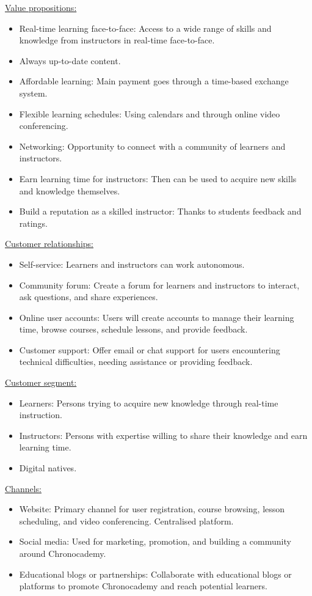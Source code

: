 \underline{Value propositions:}
\begin{itemize}
\item Real-time learning face-to-face: Access to a wide range of skills and knowledge from instructors in real-time face-to-face.
\item Always up-to-date content.
\item Affordable learning: Main payment goes through a time-based exchange system.
\item Flexible learning schedules: Using calendars and through online video conferencing.
\item Networking: Opportunity to connect with a community of learners and instructors.
\item Earn learning time for instructors: Then can be used to acquire new skills and knowledge themselves.
\item Build a reputation as a skilled instructor: Thanks to students feedback and ratings.
\end{itemize}

\underline{Customer relationships:}
\begin{itemize}
\item Self-service: Learners and instructors can work autonomous.
\item Community forum: Create a forum for learners and instructors to interact, ask questions, and share experiences.
\item Online user accounts: Users will create accounts to manage their learning time, browse courses, schedule lessons, and provide feedback.
\item Customer support: Offer email or chat support for users encountering technical difficulties, needing assistance or providing feedback.
\end{itemize}

\underline{Customer segment:}
\begin{itemize}
\item Learners: Persons trying to acquire new knowledge through real-time instruction.
\item Instructors: Persons with expertise willing to share their knowledge and earn learning time.
\item Digital natives.
\end{itemize}

\underline{Channels:}
\begin{itemize}
\item Website: Primary channel for user registration, course browsing, lesson scheduling, and video conferencing.
Centralised platform.
\item Social media: Used for marketing, promotion, and building a community around Chronocademy.
\item Educational blogs or partnerships: Collaborate with educational blogs or platforms to promote Chronocademy and reach potential learners.
\end{itemize}

